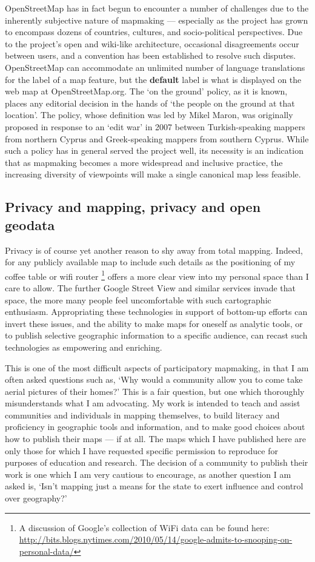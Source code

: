 \documentclass[11pt,oneside,notitlepage]{report}
\begin{document}
OpenStreetMap has in fact begun to encounter a number of challenges due to the inherently subjective nature of mapmaking --- especially as the project has grown to encompass dozens of countries, cultures, and socio-political perspectives. Due to the project's open and wiki-like architecture, occasional disagreements occur between users, and a convention has been established to resolve such disputes. OpenStreetMap can accommodate an unlimited number of language translations for the label of a map feature, but the \textbf{default} label is what is displayed on the web map at OpenStreetMap.org. The `on the ground' policy, as it is known, places any editorial decision in the hands of `the people on the ground at that location'. The policy, whose definition was led by Mikel Maron, was originally proposed in response to an `edit war' in 2007 between Turkish-speaking mappers from northern Cyprus and Greek-speaking mappers from southern Cyprus. \cite{osm2007disputes} While such a policy has in general served the project well, its necessity is an indication that as mapmaking becomes a more widespread and inclusive practice, the increasing diversity of viewpoints will make a single canonical map less feasible. 

\subsection{Privacy and mapping, privacy and open geodata}

Privacy is of course yet another reason to shy away from total mapping. Indeed, for any publicly available map to include such details as the positioning of my coffee table or wifi router \footnote{A discussion of Google's collection of WiFi data can be found here: \url{http://bits.blogs.nytimes.com/2010/05/14/google-admits-to-snooping-on-personal-data/}} offers a more clear view into my personal space than I care to allow. The further Google Street View and similar services invade that space, the more many people feel uncomfortable with such cartographic enthusiasm. Appropriating these technologies in support of bottom-up efforts can invert these issues, and the ability to make maps for oneself as analytic tools, or to publish selective geographic information to a specific audience, can recast such technologies as empowering and enriching.  

This is one of the most difficult aspects of participatory mapmaking, in that I am often asked questions such as, `Why would a community allow you to come take aerial pictures of their homes?' This is a fair question, but one which thoroughly misunderstands what I am advocating. My work is intended to teach and assist communities and individuals in mapping themselves, to build literacy and proficiency in geographic tools and information, and to make good choices about how to publish their maps --- if at all. The maps which I have published here are only those for which I have requested specific permission to reproduce for purposes of education and research. The decision of a community to publish their work is one which I am very cautious to encourage, as another question I am asked is, `Isn't mapping just a means for the state to exert influence and control over geography?' 
\end{document}
